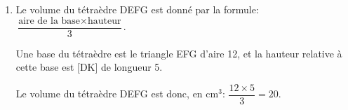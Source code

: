 \documentclass[10pt]{article}
\begin{document}
\begin{enumerate}
\begin{enumerate}
Donc la distance DK est égale à 5~cm.
		
		\item Le volume du tétraèdre DEFG est donné par la formule:
$ \dfrac{\text{aire de la base}\times\text{hauteur}}{3}$.

Une base du tétraèdre est le triangle EFG d'aire 12,
et la hauteur relative à cette base est [DK] de longueur 5.				

Le volume du tétraèdre DEFG est donc, en cm$^3$:
$\dfrac{12\times 5}{3}=20$.
	\end{enumerate}
\end{enumerate}

\bigskip
\end{document}
